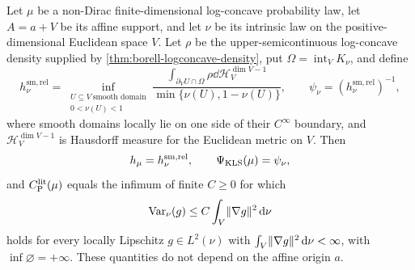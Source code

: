 \begin{theorem}
  \label{thm:klartag-density-frontend-identification}
  \leanok
  Let $\mu$ be a non-Dirac finite-dimensional log-concave probability law, let $A=a+V$ be its
  affine support, and let $\nu$ be its intrinsic law on the positive-dimensional Euclidean space
  $V$.  Let $\rho$ be the upper-semicontinuous log-concave density supplied by
  \cref{thm:borell-logconcave-density}, put $\Omega=\operatorname{int}_V K_\nu$, and define
  \[
    h_\nu^{\mathrm{sm,rel}}
      =\inf_{\substack{U\subseteq V\ \text{smooth domain}\\
                       0<\nu(U)<1}}
        \frac{\displaystyle\int_{\partial_VU\cap\Omega}\rho
          \dd\mathcal H_V^{\dim V-1}}
             {\min\{\nu(U),1-\nu(U)\}},
    \qquad
    \psi_\nu=(h_\nu^{\mathrm{sm,rel}})^{-1},
  \]
  where smooth domains locally lie on one side of their $C^\infty$ boundary, and
  $\mathcal H_V^{\dim V-1}$ is Hausdorff measure for the Euclidean metric on $V$.
  Then
  \[
    h_\mu=h_\nu^{\mathrm{sm,rel}},
    \qquad
    \Psi_{\mathrm{KLS}}(\mu)=\psi_\nu,
  \]
  and $C_{\mathrm P}^{\mathrm{lit}}(\mu)$ equals the infimum of finite $C\ge0$ for which
  \[
    \operatorname{Var}_\nu(g)\le C\int_V\lVert\nabla g\rVert^2\,\mathrm d\nu
  \]
  holds for every locally Lipschitz $g\in L^2(\nu)$ with
  $\int_V\lVert\nabla g\rVert^2\,\mathrm d\nu<\infty$, with $\inf\varnothing=+\infty$.  These quantities
  do not depend on the affine origin $a$.
\end{theorem}
